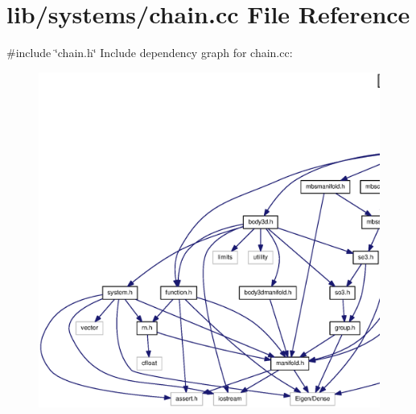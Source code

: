 \section{lib/systems/chain.cc \-File \-Reference}
\label{chain_8cc}
{\ttfamily \#include \char`\"{}chain.\-h\char`\"{}}\*
\-Include dependency graph for chain.\-cc\-:
\nopagebreak
\begin{figure}[H]
\begin{center}
\leavevmode
\includegraphics[width=350pt]{chain_8cc__incl}
\end{center}
\end{figure}
